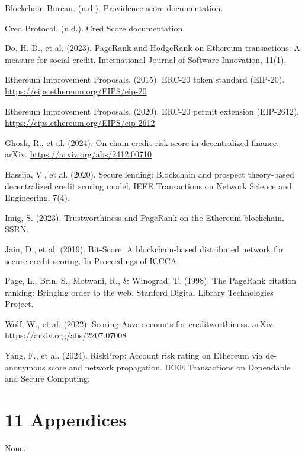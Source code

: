 \documentclass[12pt]{article}
\begin{document}
\hangindent=0.5in  Blockchain Bureau. (n.d.). Providence score documentation.\par

\hangindent=0.5in  Cred Protocol. (n.d.). Cred Score documentation.\par

\hangindent=0.5in  Do, H. D., et al. (2023). PageRank and HodgeRank on Ethereum transactions: A measure for social credit. International Journal of Software Innovation, 11(1).\par

\hangindent=0.5in  Ethereum Improvement Proposals. (2015). ERC-20 token standard (EIP-20). \href{https://eips.ethereum.org/EIPS/eip-20}{https://eips.ethereum.org/EIPS/eip-20}\par

\hangindent=0.5in  Ethereum Improvement Proposals. (2020). ERC-20 permit extension (EIP-2612). \href{https://eips.ethereum.org/EIPS/eip-2612}{https://eips.ethereum.org/EIPS/eip-2612}\par

\hangindent=0.5in  Ghosh, R., et al. (2024). On-chain credit risk score in decentralized finance. arXiv. \href{https://arxiv.org/abs/2412.00710}{https://arxiv.org/abs/2412.00710}\par

\hangindent=0.5in  Hassija, V., et al. (2020). Secure lending: Blockchain and prospect theory-based decentralized credit scoring model. IEEE Transactions on Network Science and Engineering, 7(4).\par

\hangindent=0.5in  Imig, S. (2023). Trustworthiness and PageRank on the Ethereum blockchain. SSRN.\par

\hangindent=0.5in  Jain, D., et al. (2019). Bit-Score: A blockchain-based distributed network for secure credit scoring. In Proceedings of ICCCA.\par

\hangindent=0.5in  Page, L., Brin, S., Motwani, R., \& Winograd, T. (1998). The PageRank citation ranking: Bringing order to the web. Stanford Digital Library Technologies Project.\par

\hangindent=0.5in  Wolf, W., et al. (2022). Scoring Aave accounts for creditworthiness. arXiv. https://arxiv.org/abs/2207.07008\par

\hangindent=0.5in  Yang, F., et al. (2024). RiskProp: Account risk rating on Ethereum via de-anonymous score and network propagation. IEEE Transactions on Dependable and Secure Computing.\par

\clearpage
{}
\section*{11 \textbf{Appendices}}
\label{sec:appendices}

None.
\end{document}
